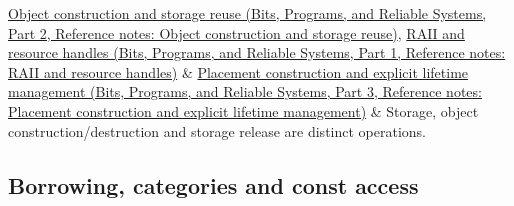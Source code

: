 {\begin{longtable}[]
\href{../01-Bits-Programs-and-Reliable-Systems-P02/main.pdf\#appendix-a82f9c438857}{Object construction and storage reuse (Bits, Programs, and Reliable Systems, Part 2, Reference notes: Object construction and storage reuse)}, \href{../01-Bits-Programs-and-Reliable-Systems-P01/main.pdf\#appendix-69739d3ab49b}{RAII and resource handles (Bits, Programs, and Reliable Systems, Part 1, Reference notes: RAII and resource handles)} & \href{../01-Bits-Programs-and-Reliable-Systems-P03/main.pdf\#appendix-f56c3e43fd4e}{Placement construction and explicit lifetime management (Bits, Programs, and Reliable Systems, Part 3, Reference notes: Placement construction and explicit lifetime management)} & Storage, object construction/destruction and storage release are distinct operations. \\
\end{longtable}
}

\subsection{Borrowing, categories and const access}\label{appendix-4ad47bdd269a-borrowing-categories-and-const-access}

\hypertarget{appendix-4ad47bdd269a-borrowing-categories-and-const-access}{}

